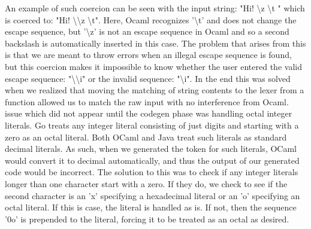 \documentclass{article}
\begin{document}
An example of such coercion can be seen with the input string: "Hi! \textbackslash{z} \textbackslash{t} " which is coerced to: "Hi! \textbackslash{\textbackslash{z}} \textbackslash{t}".
Here, Ocaml recognizes '\textbackslash{t}' and does not change the escape sequence, but '\textbackslash{z}' is not an escape sequence in Ocaml and so a second backslash is automatically inserted in this case.
The problem that arises from this is that we are meant to throw errors when an illegal escape sequence is found, but this coercion makes it impossible to know whether the user entered the valid escape sequence: "\textbackslash{\textbackslash{i}}" or the invalid sequence: "\textbackslash{i}".
In the end this was solved when we realized that moving the matching of string contents to the lexer from a function allowed us to match the raw input with no interference from Ocaml.\\
 issue which did not appear until the codegen phase was handling octal integer literals.
Go treats any integer literal consisting of just digits and starting with a zero as an octal literal.
Both OCaml and Java treat such literals as standard decimal literals.
As such, when we generated the token for such literals, OCaml would convert it to decimal automatically, and thus the output of our generated code would be incorrect.
The solution to this was to check if any integer literals longer than one character start with a zero.
If they do, we check to see if the second character is an 'x' specifying a hexadecimal literal or an 'o' specifying an octal literal.
If this is case, the literal is handled as is.
If not, then the sequence '0o' is prepended to the literal, forcing it to be treated as an octal as desired.
\end{document}
